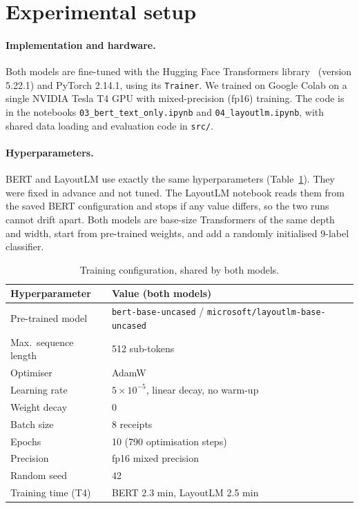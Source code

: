 
\section{Experimental setup}
\label{sec:setup}

\paragraph{Implementation and hardware.}
Both models are fine-tuned with the Hugging Face Transformers library~\cite{wolf2020transformers} (version 5.22.1) and PyTorch 2.14.1, using its \texttt{Trainer}. We trained on Google Colab on a single NVIDIA Tesla T4 GPU with mixed-precision (fp16) training. The code is in the notebooks \texttt{03\_bert\_text\_only.ipynb} and \texttt{04\_layoutlm.ipynb}, with shared data loading and evaluation code in \texttt{src/}.

\paragraph{Hyperparameters.}
BERT and LayoutLM use exactly the same hyperparameters (Table~\ref{tab:hparams}). They were fixed in advance and not tuned. The LayoutLM notebook reads them from the saved BERT configuration and stops if any value differs, so the two runs cannot drift apart. Both models are base-size Transformers of the same depth and width, start from pre-trained weights, and add a randomly initialised 9-label classifier.

\begin{table}[t]
  \centering
  \small
  \begin{tabular}{ll}
    \toprule
    Hyperparameter & Value (both models) \\
    \midrule
    Pre-trained model   & \texttt{bert-base-uncased} / \texttt{microsoft/layoutlm-base-uncased} \\
    Max.\ sequence length & 512 sub-tokens \\
    Optimiser           & AdamW~\cite{loshchilov2019adamw} \\
    Learning rate       & $5 \times 10^{-5}$, linear decay, no warm-up \\
    Weight decay        & 0 \\
    Batch size          & 8 receipts \\
    Epochs              & 10 (790 optimisation steps) \\
    Precision           & fp16 mixed precision \\
    Random seed         & 42 \\
    \midrule
    Training time (T4)  & BERT 2.3 min, LayoutLM 2.5 min \\
    \bottomrule
  \end{tabular}
  \caption{Training configuration, shared by both models.}
  \label{tab:hparams}
\end{table}

